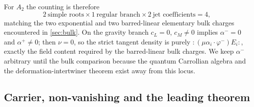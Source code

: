\documentclass[11pt,a4paper]{article}
\numberwithin{equation}{section}
\theoremstyle{remark}
\begin{document}
For $A_2$ the counting is therefore
\begin{equation}
 2\ \text{simple roots}\times1\ \text{regular branch}\times2\ \text{jet coefficients}=4,
 \label{eq:screening-count}
\end{equation}
matching the two exponential and two barred-linear elementary bulk charges encountered in
\cref{sec:bulk}.  On the gravity branch $c_L=0$, $c_M\ne0$ implies $\alpha^-=0$ and
$\alpha^+\ne0$; then $\nu=0$, so the strict tangent density is purely
$:(\mu\alpha_i\cdot\varphi^-)E_i:$, exactly the field content required by the barred-linear
bulk charges.  We keep $\alpha^-$ arbitrary until the bulk comparison because the quantum
Carrollian algebra and the deformation-intertwiner theorem exist away from this locus.

\subsection{Carrier, non-vanishing and the leading theorem}
\end{document}
